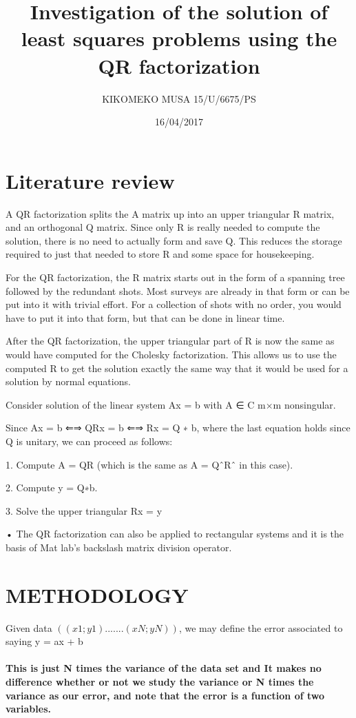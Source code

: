 \documentclass[12pt, letterpaper]{article}
\begin{document}
\section{Literature review}
    A QR factorization splits the A matrix up into an upper triangular R matrix, and an orthogonal Q matrix. Since only R is really needed to compute the solution, there is no need to actually form and save Q. This reduces the storage required to just that needed to store R and some space for housekeeping.\par
    For the QR factorization, the R matrix starts out in the form of a spanning tree followed by the redundant shots. Most surveys are already in that form or can be put into it with trivial effort. For a collection of shots with no order, you would have to put it into that form, but that can be done in linear time.\par
    After the QR factorization, the upper triangular part of R is now the same as would have computed for the Cholesky factorization. This allows us to use the computed R to get the solution exactly the same way that it would be used for a solution by normal equations.\par
    Consider solution of the linear system Ax = b with A ∈ C m×m nonsingular.\par
    Since Ax = b ⇐⇒ QRx = b ⇐⇒ Rx = Q ∗ b, where the last equation holds since Q is unitary, we can proceed as follows:\par
     1. Compute A = QR (which is the same as A = QˆRˆ in this case).\par
     2. Compute y = Q∗b.\par
     3. Solve the upper triangular Rx = y\par
    •	The QR factorization can also be applied to rectangular systems and it is the basis of Mat lab’s backslash matrix division operator.\par
\title{Investigation of the solution of least squares problems using the QR factorization}
\author{KIKOMEKO MUSA 15/U/6675/PS \\}
\date{16/04/2017}
\maketitle
\section{METHODOLOGY}
Given data $((x1; y1).......(xN; yN))$, we may define the error associated to saying y = ax + b
\paragraph{This is just N times the variance of the data set and It makes no difference whether or not we study the variance or N times the variance as our error, and note that the error is a function of two variables.}
\end{document}
